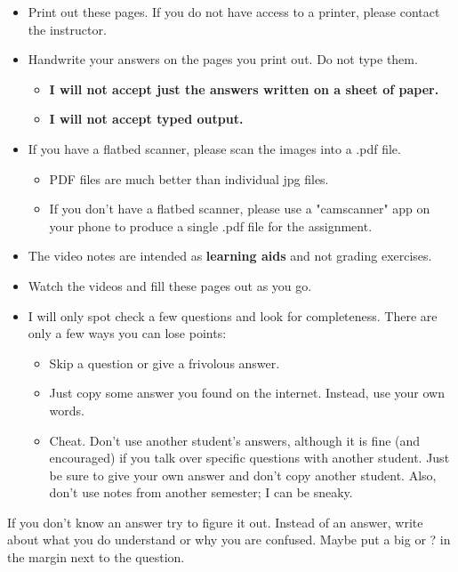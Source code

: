 \documentclass[letterpaper,12pt]{exam}
\begin{document}
\begin{itemize}
	\item Print out these pages.  If you do not have access to a printer, please contact the instructor.
	\item Handwrite your answers on the pages you print out. Do not type them.
	   \begin{itemize}
		  \item \textbf{I will not accept just the answers written on a sheet of paper.}  
		  \item \textbf{I will not accept typed output.}
	   \end{itemize}
	\item If you have a flatbed scanner, please scan the images into a .pdf file.  
	  \begin{itemize}
         \item PDF files are much better than individual jpg files.
         \item If you don't have a flatbed scanner, please use a "camscanner" app on your phone to produce a single .pdf file for the assignment.
      \end{itemize}

	\item The video notes are intended as \textbf{learning aids} and not grading exercises.
	\item Watch the videos and fill these pages out as you go.
	\item I will only spot check a few questions and look for completeness.  There are only a few ways you can lose points:
	   \begin{itemize}
	     \item Skip a question or give a frivolous answer. 
		 \item Just copy some answer you found on the internet.  Instead, use your own words.
	     \item Cheat.  Don't use another student's answers, although it is fine (and encouraged) if you talk over specific questions with another student.  Just be sure to give your own answer and don't copy another student.  Also, don't use notes from another semester; I can be sneaky.
	   \end{itemize}
	\end{itemize}

If you don't know an answer try to figure it out.  Instead of an answer,
write about what you do understand or why you are confused.  Maybe put a big \textcolor{BrickRed}{\Huge*} or \textcolor{BrickRed}{\Huge?} in the margin next to 
the question.
\end{document}

